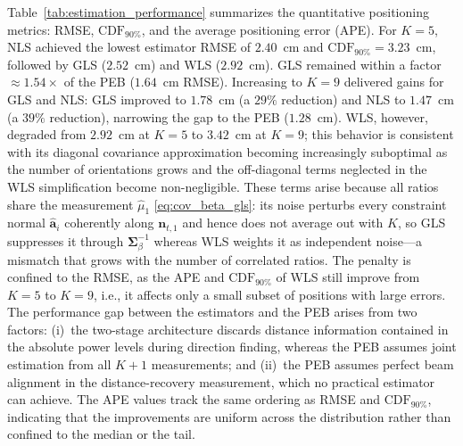\documentclass[journal]{IEEEtran}
\begin{document}
Table~\ref{tab:estimation_performance} summarizes the quantitative positioning metrics: RMSE, $\mathrm{CDF}_{90\%}$, and the average positioning error (APE). For $K=5$, NLS achieved the lowest estimator RMSE of $2.40$~cm and $\mathrm{CDF}_{90\%}=3.23$~cm, followed by GLS ($2.52$~cm) and WLS ($2.92$~cm). GLS remained within a factor $\approx1.54\times$ of the PEB ($1.64$~cm RMSE). Increasing to $K=9$ delivered gains for GLS and NLS: GLS improved to $1.78$~cm (a $29\%$ reduction) and NLS to $1.47$~cm (a $39\%$ reduction), narrowing the gap to the PEB ($1.28$~cm). WLS, however, degraded from $2.92$~cm at $K=5$ to $3.42$~cm at $K=9$; this behavior is consistent with its diagonal covariance approximation becoming increasingly suboptimal as the number of orientations grows and the off-diagonal terms neglected in the WLS simplification become non-negligible.
These terms arise because all ratios share the measurement $\hat\mu_1$ \eqref{eq:cov_beta_gls}: its noise perturbs every constraint normal $\hat{\mathbf a}_i$ coherently along $\mathbf n_{t,1}$ and hence does not average out with $K$, so GLS suppresses it through $\mathbf\Sigma_\beta^{-1}$ whereas WLS weights it as independent noise---a mismatch that grows with the number of correlated ratios. The penalty is confined to the RMSE, as the APE and $\mathrm{CDF}_{90\%}$ of WLS still improve from $K{=}5$ to $K{=}9$, i.e., it affects only a small subset of positions with large errors.
The performance gap between the estimators and the PEB arises from two factors: (i)~the two-stage architecture discards distance information contained in the absolute power levels during direction finding, whereas the PEB assumes joint estimation from all $K+1$ measurements; and (ii)~the PEB assumes perfect beam alignment in the distance-recovery measurement, which no practical estimator can achieve.
The APE values track the same ordering as RMSE and \(\mathrm{CDF}_{90\%}\), indicating that the improvements are uniform across the distribution rather than confined to the median or the tail.
\end{document}
